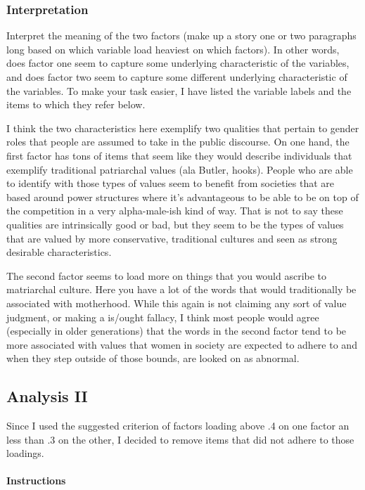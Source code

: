 \documentclass[]{book}
\let\oldparagraph\paragraph
\renewcommand{\paragraph}[1]{\oldparagraph{#1}\mbox{}}
\theoremstyle{definition}
\theoremstyle{definition}
\theoremstyle{definition}
\theoremstyle{remark}
\begin{document}
\subsubsection{Interpretation}\label{interpretation}

Interpret the meaning of the two factors (make up a story one or two
paragraphs long based on which variable load heaviest on which factors).
In other words, does factor one seem to capture some underlying
characteristic of the variables, and does factor two seem to capture
some different underlying characteristic of the variables. To make your
task easier, I have listed the variable labels and the items to which
they refer below.

I think the two characteristics here exemplify two qualities that
pertain to gender roles that people are assumed to take in the public
discourse. On one hand, the first factor has tons of items that seem
like they would describe individuals that exemplify traditional
patriarchal values (ala Butler, hooks). People who are able to identify
with those types of values seem to benefit from societies that are based
around power structures where it's advantageous to be able to be on top
of the competition in a very alpha-male-ish kind of way. That is not to
say these qualities are intrinsically good or bad, but they seem to be
the types of values that are valued by more conservative, traditional
cultures and seen as strong desirable characteristics.

The second factor seems to load more on things that you would ascribe to
matriarchal culture. Here you have a lot of the words that would
traditionally be associated with motherhood. While this again is not
claiming any sort of value judgment, or making a is/ought fallacy, I
think most people would agree (especially in older generations) that the
words in the second factor tend to be more associated with values that
women in society are expected to adhere to and when they step outside of
those bounds, are looked on as abnormal.

\subsection{Analysis II}\label{analysis-ii}

Since I used the suggested criterion of factors loading above .4 on one
factor an less than .3 on the other, I decided to remove items that did
not adhere to those loadings.

\paragraph{Instructions}\label{instructions}
\end{document}
